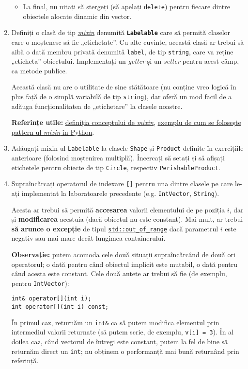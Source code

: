 \begin{enumerate}
\begin{itemize}
        \item La final, nu uitați să ștergeți (să apelați \texttt{delete}) pentru fiecare dintre obiectele alocate dinamic din vector.
    \end{itemize}

    \item Definiți o clasă de tip \href{https://en.wikipedia.org/wiki/Mixin}{\emph{mixin}} denumită \texttt{\textbf{Labelable}} care să permită claselor care o moștenesc să fie „etichetate”. Cu alte cuvinte, această clasă ar trebui să aibă o dată membru privată denumită \texttt{label}, de tip \texttt{string}, care va reține „eticheta” obiectului. Implementați un \emph{getter} și un \emph{setter} pentru acest câmp, ca metode publice.

    Această clasă nu are o utilitate de sine stătătoare (nu conține vreo logică în plus față de o simplă variabilă de tip \texttt{string}), dar oferă un mod facil de a adăuga funcționalitatea de „etichetare” la clasele noastre.

    \textbf{Referințe utile:} \href{https://en.wikipedia.org/wiki/Mixin}{definiția conceptului de \emph{mixin}}, \href{https://stackoverflow.com/a/547714/5723188}{exemplu de cum se folosește pattern-ul \emph{mixin} în Python}.

    \item Adăugați mixin-ul \texttt{Labelable} la clasele \texttt{Shape} și \texttt{Product} definite în exercițiile anterioare (folosind moștenirea multiplă). Încercați să setați și să afișați etichetele pentru obiecte de tip \texttt{Circle}, respectiv \texttt{PerishableProduct}.

    \item Supraîncărcați operatorul de indexare \texttt{[]} pentru una dintre clasele pe care le-ați implementat la laboratoarele precedente (e.g. \texttt{IntVector}, \texttt{String}).
    
    Acesta ar trebui să permită \textbf{accesarea} valorii elementului de pe poziția \(i\), dar și \textbf{modificarea} acestuia (dacă obiectul nu este constant). Mai mult, ar trebui \textbf{să arunce o excepție} de tipul \href{https://en.cppreference.com/w/cpp/error/out_of_range}{\texttt{std::out\_of\_range}} dacă parametrul \(i\) este negativ sau mai mare decât lungimea containerului.

    \textbf{Observație:} putem acomoda cele două situații supraîncărcând de două ori operatorul; o dată pentru când obiectul implicit este mutabil, o dată pentru când acesta este constant. Cele două antete ar trebui să fie (de exemplu, pentru \texttt{IntVector}):
    \begin{lstlisting}
int& operator[](int i);
int operator[](int i) const;
    \end{lstlisting}
    În primul caz, returnăm un \texttt{int\&} ca să putem modifica elementul prin intermediul valorii returnate (să putem scrie, de exemplu, \texttt{v[i] = 3}). În al doilea caz, când vectorul de întregi este constant, putem la fel de bine să returnăm direct un \texttt{int}; nu obținem o performanță mai bună returnând prin referință.


\end{enumerate}
